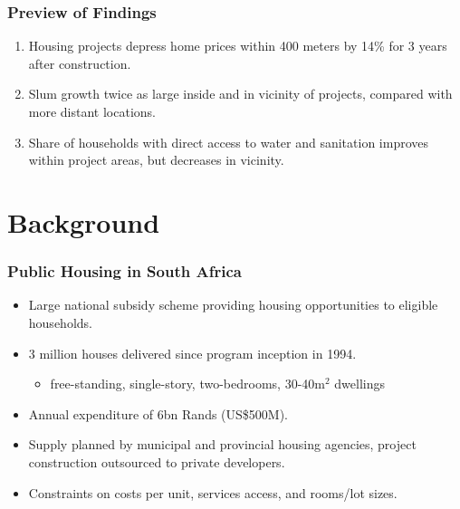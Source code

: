 \documentclass[aspectratio=149]{beamer}
\begin{document}
\begin{frame}
\frametitle{Preview of Findings}

\centering
\begin{enumerate}


\item<1-> Housing projects depress home prices within 400 meters by 14\% for 3 years after construction.
\vspace{2mm}
\item<2-> Slum growth twice as large inside and in vicinity of projects, compared with more distant locations.
\vspace{2mm}
\item<3-> Share of households with direct access to water and sanitation improves within project areas, but decreases in vicinity.

\end{enumerate}

\end{frame}


\section{Background}


\begin{frame}
\frametitle{Public Housing in South Africa}
  \begin{itemize}
    \item Large national subsidy scheme providing housing opportunities to eligible households.
    \vspace{2mm}
    \item 3 million houses delivered since program inception in 1994.\
        \begin{itemize}
          \item free-standing, single-story, two-bedrooms, 30-40$\text{m}^2$ dwellings
        \end{itemize}
    \vspace{2mm}
    \item Annual expenditure of 6bn Rands (US\$500M).
    \vspace{2mm}
    \item Supply planned by municipal and provincial housing agencies, project construction outsourced to private developers.
    \vspace{2mm} 
    \item Constraints on costs per unit, services access, and rooms/lot sizes.
  \end{itemize}
\end{frame}
\end{document}
